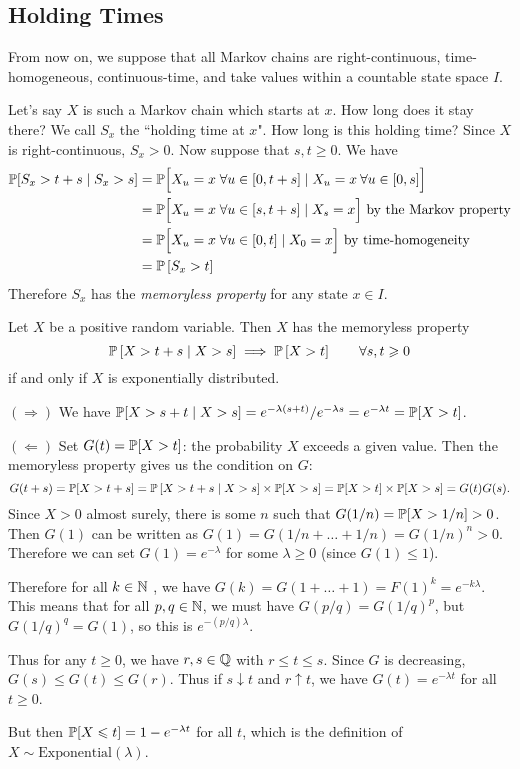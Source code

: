 \documentclass{article}
\begin{document}
\subsection{Holding Times}

\begin{note}
	From now on, we suppose that all Markov chains are right-continuous, time-homogeneous, continuous-time, and take values within a countable state space $I$. 
\end{note}

Let's say $X$ is such a Markov chain which starts at $x$. How long does it stay there? We call $S_x$ the ``holding time at $x$". How long is this holding time? Since $X$ is right-continuous, $S_x > 0$. Now suppose that $s, t \geq 0$. We have
\begin{align*}
    \P[S_x > t+s \mid S_x > s] &= \P \Big[X_u = x  \; \forall u \in [0, t+s] \mid  X_u = x \: \forall u \in [0, s] \Big] \\
    &= \P \Big[X_u = x  \; \forall u \in [s, t+s] \mid  X_s = x \Big] \text{ by the Markov property} \\
    &= \P \Big[X_u = x  \; \forall u \in [0, t] \mid  X_0 = x \Big] \text{ by time-homogeneity} \\
    &= \P \left[S_x > t \right]
\end{align*}
Therefore $S_x$ has the \textit{memoryless property} for any state $x \in I$.

\begin{theorem}
    Let $X$ be a positive random variable. Then $X$ has the memoryless property
    \[
	\P \left[ X > t+s \mid X > s \right] \implies \P \left[ X > t \right] \qquad \forall s, t \geq 0
	\]
	if and only if $X$ is exponentially distributed.
\end{theorem}
\begin{prf}
    $(\Rightarrow)$ We have $\P[X > s + t \mid X > s] = e^{-\lambda(s+t)}/e^{-\lambda s} = e^{-\lambda t} = \P[X > t]$.
    
    $(\Leftarrow)$ Set $G(t) = \P[X > t]$: the probability $X$ exceeds a given value. Then the memoryless property gives us the condition on $G$:
    \[
	G(t+s) = \P[X > t+s] = \P \left[ X > t+s \mid X > s \right] \times \P[X > s] = \P[X > t]\times \P[X > s] = G(t)G(s).
	\]
	Since $X > 0$ almost surely, there is some $n$ such that $G(1/n) = \P[X > 1/n] > 0$. Then $G(1)$ can be written as $G(1) = G(1/n + \dots + 1/n) = G(1/n)^n > 0$. Therefore we can set $G(1) = e^{-\lambda}$ for some $\lambda \geq 0$ (since $G(1) \leq 1$).
	
	Therefore for all $k \in \N$ , we have $G(k) = G(1 + \dots + 1) = F(1)^k = e^{-k\lambda}$. This means that for all $p, q \in \N$, we must have $G(p/q) = G(1/q)^p$, but $G(1/q)^q = G(1)$, so this is $e^{-(p/q)\lambda}$.
	
	Thus for any $t \geq 0$, we have $r, s \in \Q$ with $r\leq t \leq s$. Since $G$ is decreasing, $G(s) \leq G(t) \leq G(r)$. Thus if $s \downarrow t$ and $r \uparrow t$, we have $G(t) = e^{-\lambda t}$ for all $t \geq 0$.
	
	But then $\P[X \leq t] = 1 - e^{-\lambda t}$ for all $t$, which is the definition of $X \sim \mathrm{Exponential}(\lambda)$.
\end{prf}
\end{document}
